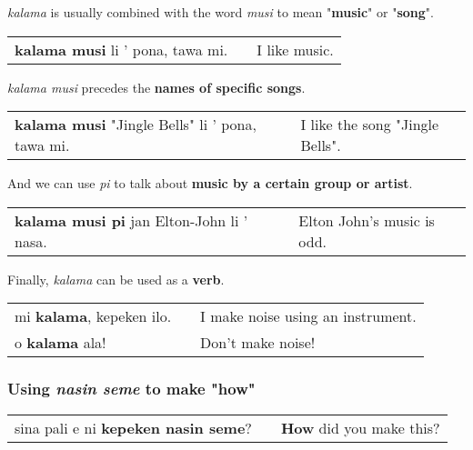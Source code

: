 \textit{kalama} is usually combined with the word \textit{musi} to mean "\textbf{music}" or "\textbf{song}". \\
\begin{supertabular}{p{5,5cm}|ll}
\textbf{kalama musi} li ' pona, tawa mi. && I like music. \\
\end{supertabular}  

\textit{kalama musi} precedes the \textbf{names of specific songs}. \\
\begin{supertabular}{p{5,5cm}|ll}
\textbf{kalama musi} "Jingle Bells" li ' pona, tawa mi. && I like the song "Jingle Bells". \\
\end{supertabular}  

And we can use \textit{pi} to talk about \textbf{music by a certain group or artist}. \\
\begin{supertabular}{p{5,5cm}|ll}
\textbf{kalama musi pi} jan Elton-John li ' nasa. && Elton John's music is odd. \\
\end{supertabular}  

Finally, \textit{kalama} can be used as a \textbf{verb}. \\
\begin{supertabular}{p{5,5cm}|ll}
mi \textbf{kalama}, kepeken ilo. && I make noise using an instrument. \\
o \textbf{kalama} ala! && Don't make noise! \\
\end{supertabular}  
%
\subsubsection*{Using \textit{nasin seme} to make "how"}
%
\begin{supertabular}{p{5,5cm}|ll}
sina pali e ni \textbf{kepeken nasin seme}? && \textbf{How} did you make this? \\
\end{supertabular}  
%
%
